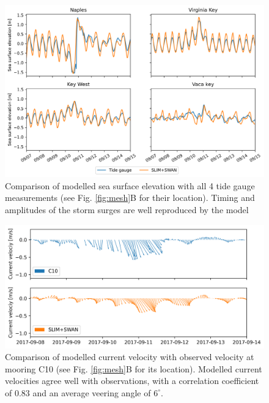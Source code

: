 \documentclass[preprint,12pt,authoryear]{elsarticle}
\begin{document}
\begin{figure}
    \centering
    \includegraphics[width=\textwidth]{fig/elevation_with_map.png}
    \caption{Comparison of modelled sea surface elevation with all 4 tide gauge measurements (see Fig. \ref{fig:mesh}B for their location). Timing and amplitudes of the storm surges are well reproduced by the model}
    \label{fig:sse}
\end{figure}
\begin{figure}
    \includegraphics[width=\textwidth]{fig/validation_currents_C10_ww3.png}
    \caption{Comparison of modelled current velocity with observed velocity at mooring C10 (see Fig. \ref{fig:mesh}B for its location). Modelled current velocities agree well with observations, with a correlation coefficient of 0.83 and an average veering angle of $6^\circ$.}
    \label{fig:uv}
\end{figure}
\end{document}
